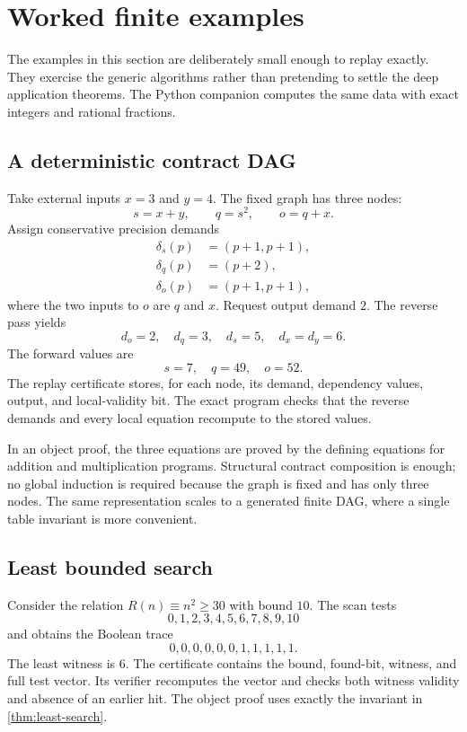 \section{Worked finite examples}

The examples in this section are deliberately small enough to replay exactly.  They exercise the generic algorithms rather than pretending to settle the deep application theorems.  The Python companion computes the same data with exact integers and rational fractions.

\subsection{A deterministic contract DAG}

Take external inputs $x=3$ and $y=4$.  The fixed graph has three nodes:
\[
 s=x+y,\qquad q=s^2,\qquad o=q+x.
\]
Assign conservative precision demands
\[
\begin{aligned}
 \delta_s(p)&=(p+1,p+1),\\
 \delta_q(p)&=(p+2),\\
 \delta_o(p)&=(p+1,p+1),
\end{aligned}
\]
where the two inputs to $o$ are $q$ and $x$.  Request output demand $2$.  The reverse pass yields
\[
 d_o=2,
 \quad d_q=3,
 \quad d_s=5,
 \quad d_x=d_y=6.
\]
The forward values are
\[
 s=7,
 \quad q=49,
 \quad o=52.
\]
The replay certificate stores, for each node, its demand, dependency values, output, and local-validity bit.  The exact program checks that the reverse demands and every local equation recompute to the stored values.

In an object proof, the three equations are proved by the defining equations for addition and multiplication programs.  Structural contract composition is enough; no global induction is required because the graph is fixed and has only three nodes.  The same representation scales to a generated finite DAG, where a single table invariant is more convenient.

\subsection{Least bounded search}

Consider the relation $R(n)\equiv n^2\geq30$ with bound $10$.  The scan tests
\[
 0,1,2,3,4,5,6,7,8,9,10
\]
and obtains the Boolean trace
\[
 0,0,0,0,0,0,1,1,1,1,1.
\]
The least witness is $6$.  The certificate contains the bound, found-bit, witness, and full test vector.  Its verifier recomputes the vector and checks both witness validity and absence of an earlier hit.  The object proof uses exactly the invariant in \cref{thm:least-search}.

